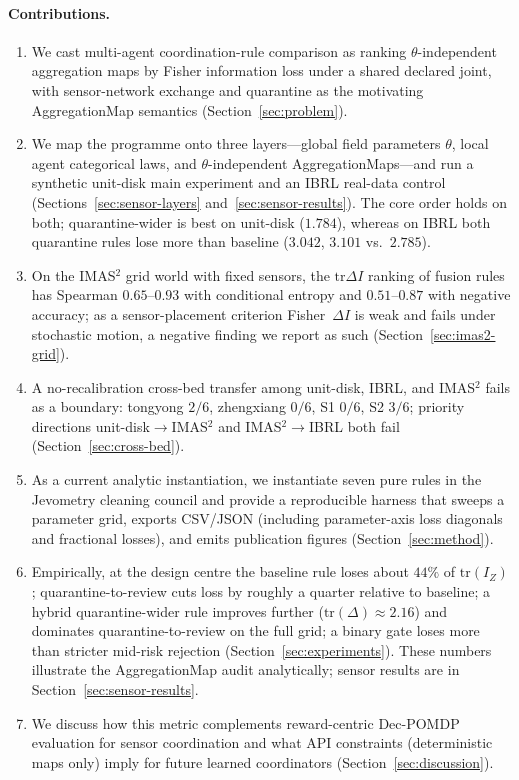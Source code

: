 \documentclass[11pt,a4paper]{article}
\begin{document}
\paragraph{Contributions.}
\begin{enumerate}
  \item We cast multi-agent coordination-rule comparison as ranking
  $\theta$-independent aggregation maps by Fisher information loss under a
  shared declared joint, with sensor-network exchange and quarantine as the
  motivating AggregationMap semantics (Section~\ref{sec:problem}).
  \item We map the programme onto three layers---global field parameters
  $\theta$, local agent categorical laws, and $\theta$-independent
  AggregationMaps---and run a synthetic unit-disk main experiment and an IBRL
  real-data control (Sections~\ref{sec:sensor-layers}
  and~\ref{sec:sensor-results}). The core order holds on both; quarantine-wider
  is best on unit-disk ($1.784$), whereas on IBRL both quarantine rules lose
  more than baseline ($3.042$, $3.101$ vs.\ $2.785$).
  \item On the IMAS$^2$ grid world with fixed sensors, the $\mathrm{tr}\Delta I$
  ranking of fusion rules has Spearman $0.65$--$0.93$ with conditional entropy
  and $0.51$--$0.87$ with negative accuracy; as a sensor-placement criterion
  Fisher~$\Delta I$ is weak and fails under stochastic motion, a negative
  finding we report as such (Section~\ref{sec:imas2-grid}).
  \item A no-recalibration cross-bed transfer among unit-disk, IBRL, and IMAS$^2$ fails as a boundary: tongyong $2/6$, zhengxiang $0/6$, S1 $0/6$, S2 $3/6$; priority directions unit-disk$\to$IMAS$^2$ and IMAS$^2\to$IBRL both fail (Section~\ref{sec:cross-bed}).
  \item As a current analytic instantiation, we instantiate seven pure rules
  in the Jevometry cleaning council and provide a reproducible harness that
  sweeps a parameter grid, exports CSV/JSON (including parameter-axis loss
  diagonals and fractional losses), and emits publication figures
  (Section~\ref{sec:method}).
  \item Empirically, at the design centre the baseline rule loses about
  $44\%$ of $\mathrm{tr}(I_Z)$; quarantine-to-review cuts loss by roughly a
  quarter relative to baseline; a hybrid quarantine-wider rule improves
  further ($\mathrm{tr}(\Delta)\approx 2.16$) and dominates
  quarantine-to-review on the full grid; a binary gate loses more than
  stricter mid-risk rejection (Section~\ref{sec:experiments}). These numbers
  illustrate the AggregationMap audit analytically; sensor results are in
  Section~\ref{sec:sensor-results}.
  \item We discuss how this metric complements reward-centric Dec-POMDP
  evaluation for sensor coordination and what API constraints (deterministic
  maps only) imply for future learned coordinators
  (Section~\ref{sec:discussion}).
\end{enumerate}
\end{document}
